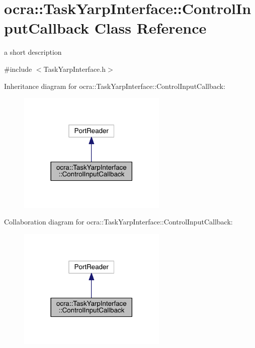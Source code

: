 \hypertarget{classocra_1_1TaskYarpInterface_1_1ControlInputCallback}{}\section{ocra\+:\+:Task\+Yarp\+Interface\+:\+:Control\+Input\+Callback Class Reference}
\label{classocra_1_1TaskYarpInterface_1_1ControlInputCallback}


a short description  




{\ttfamily \#include $<$Task\+Yarp\+Interface.\+h$>$}



Inheritance diagram for ocra\+:\+:Task\+Yarp\+Interface\+:\+:Control\+Input\+Callback\+:\nopagebreak
\begin{figure}[H]
\begin{center}
\leavevmode
\includegraphics[width=201pt]{d8/da9/classocra_1_1TaskYarpInterface_1_1ControlInputCallback__inherit__graph}
\end{center}
\end{figure}


Collaboration diagram for ocra\+:\+:Task\+Yarp\+Interface\+:\+:Control\+Input\+Callback\+:\nopagebreak
\begin{figure}[H]
\begin{center}
\leavevmode
\includegraphics[width=201pt]{dc/d21/classocra_1_1TaskYarpInterface_1_1ControlInputCallback__coll__graph}
\end{center}
\end{figure}
